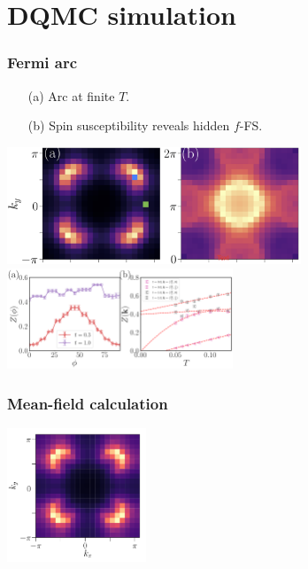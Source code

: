 \documentclass[xcolor=table, 10pt, aspectratio=43]{beamer}
\begin{document}
\section{DQMC simulation}

\begin{frame}
	\frametitle{Fermi arc}
	\begin{itemize}
		\item[(a)] Arc at finite $T$.
		\item[(b)] Spin susceptibility reveals hidden $f$-FS.
	\end{itemize}
	\begin{center}
		\includegraphics[height=3.5cm]{fermi_arc}\\
		\includegraphics[height=3cm]{arc_T}
	\end{center}
\end{frame}

\begin{frame}
	\frametitle{Mean-field calculation}
	\begin{center}
		\includegraphics[height=4cm]{arc_mf}
	\end{center}
\end{frame}
\end{document}
